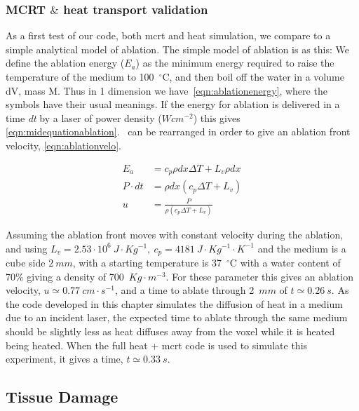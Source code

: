 \subsubsection{MCRT $\&$ heat transport validation}

As a first test of our code, both \gls{mcrt} and heat simulation, we compare to a simple analytical model of ablation. The simple model of ablation is as this: We define the ablation energy ($E_a$) as the minimum energy required to raise the temperature of the medium to 100~$^{\circ}$C, and then boil off the water in a volume dV, mass M. Thus in 1 dimension we have~\cref{eqn:ablationenergy}, where the symbols have their usual meanings. If the energy for ablation is delivered in a time \textit{dt} by a laser of power density ($Wcm^{-2}$) this gives \cref{eqn:midequationablation}.~ can be rearranged in order to give an ablation front velocity, \cref{eqn:ablationvelo}.


\begin{align}
E_a &= c_p \rho dx \Delta T + L_v \rho dx \label{eqn:ablationenergy}\\
P\cdot dt &= \rho dx (c_p \Delta T + L_v) \label{eqn:midequationablation} \\
u &= \frac{P}{\rho(c_p\Delta T+ L_v)} \label{eqn:ablationvelo}
\end{align}

Assuming the ablation front moves with constant velocity during the ablation, and using $L_v=2.53\cdot 10^6\ J\cdot Kg^{-1},\ c_p=4181\ J\cdot Kg^{-1}\cdot K^{-1}$ and the medium is a cube side $2\ mm$, with a starting temperature is 37~$^{\circ}$C with a water content of 70\% giving a density of 700~$Kg\cdot m^{-3}$. For these parameter this gives an ablation velocity, $u\simeq 0.77\ cm\cdot s^{-1}$, and a time to ablate through 2~$mm$ of $t \simeq 0.26~s$.
As the code developed in this chapter simulates the diffusion of heat in a medium due to an incident laser, the expected time to ablate through the same medium should be slightly less as heat diffuses away from the voxel while it is heated being heated. When the full heat + \gls{mcrt} code is used to simulate this experiment, it gives a time, $t \simeq 0.33~s$.	
	
\subsection{Tissue Damage}%
\label{sec:tissuedamage}

